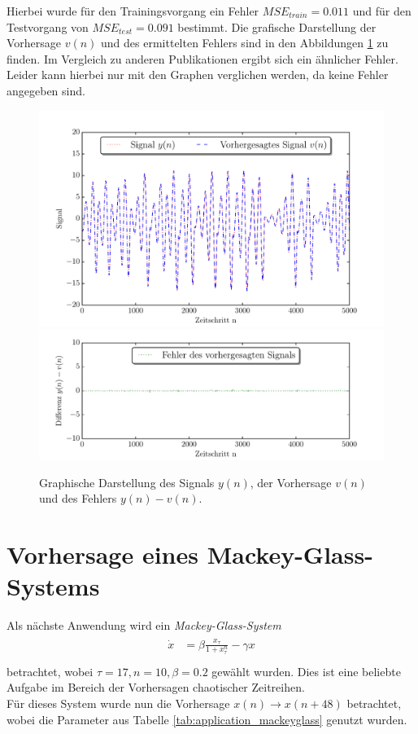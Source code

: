 Hierbei wurde für den Trainingsvorgang ein Fehler $MSE_{train} = 0.011$ und für den Testvorgang von $MSE_{test} = 0.091$ bestimmt. Die grafische Darstellung der Vorhersage $v(n)$ und des ermittelten Fehlers sind in den Abbildungen \ref{fig:application_roessler_b1} zu finden. Im Vergleich zu anderen Publikationen \cite{parlitz2005} ergibt sich ein ähnlicher Fehler. Leider kann hierbei nur mit den Graphen verglichen werden, da keine Fehler angegeben sind.

\begin{figure}[H]
    \centering
     \includegraphics[width = 0.9 \textwidth]{figures/roessler_cross_pred.pdf}
     \includegraphics[width = 0.9 \textwidth]{figures/roessler_cross_err.pdf}
    \caption{Graphische Darstellung des Signals $y(n)$, der Vorhersage $v(n)$ und des Fehlers $y(n)-v(n)$.}
    \label{fig:application_roessler_b1}
\end{figure}

\section{Vorhersage eines Mackey-Glass-Systems}
Als nächste Anwendung wird ein \textit{Mackey-Glass-System}
\begin{align}
\label{eq:application_roessler_pde}
\begin{split}
\dot{x} &= \beta \frac{x_\tau}{1+x_\tau^n}-\gamma x\\
\end{split}
\end{align}
betrachtet, wobei $\tau = 17, n=10, \beta = 0.2$ gewählt wurden. Dies ist eine beliebte Aufgabe im Bereich der Vorhersagen chaotischer Zeitreihen.\\
Für dieses System wurde nun die Vorhersage $x(n) \rightarrow x(n+48)$ betrachtet, wobei die Parameter aus Tabelle \ref{tab:application_mackeyglass} genutzt wurden.

